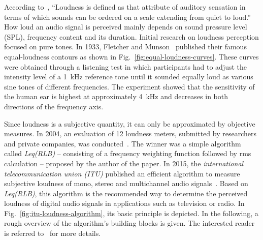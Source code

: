 According to~\cite[p. 133]{moore2012introduction}, \enquote{Loudness is defined as that attribute of auditory sensation in terms of which sounds can be ordered on a scale extending from quiet to loud.} How loud an audio signal is perceived mainly depends on sound pressure level (SPL), frequency content and its duration. Initial research on loudness perception focused on pure tones. In 1933, Fletcher and Munson~\cite{fletcher1933loudness} published their famous equal-loudness contours as shown in Fig.~\ref{fig:equal-loudness-curves}. These curves were obtained through a listening test in which participants had to adjust the intensity level of a \SI{1}{\kilo\hertz} reference tone until it sounded equally loud as various sine tones of different frequencies. The experiment showed that the sensitivity of the human ear is highest at approximately \SI{4}{\kilo\hertz} and decreases in both directions of the frequency axis.\\

Since loudness is a subjective quantity, it can only be approximated by objective measures. In 2004, an evaluation of 12 loudness meters, submitted by researchers and private companies, was conducted~\cite{soulodre2004evaluation}. The winner was a simple algorithm called \textit{Leq(RLB)} -- consisting of a frequency weighting function followed by \gls{rms} calculation -- proposed by the author of the paper. In  2015, the \textit{international telecommunication union (ITU)} published an efficient algorithm to measure subjective loudness of mono, stereo and multichannel audio signals~\cite{itu2015recommendation}. Based on \textit{Leq(RLB)}, this algorithm is the recommended way to determine the perceived loudness of digital audio signals in applications such as television or radio. In Fig.~\ref{fig:itu-loudness-algorithm}, its basic principle is depicted. In the following, a rough overview of the algorithm's building blocks is given. The interested reader is referred to~\cite{itu2015recommendation} for more details.\\

